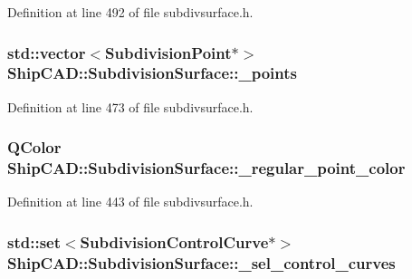 Definition at line 492 of file subdivsurface.\+h.

\subsubsection[{\texorpdfstring{\+\_\+points}{_points}}]{\setlength{\rightskip}{0pt plus 5cm}std\+::vector$<${\bf Subdivision\+Point}$\ast$$>$ Ship\+C\+A\+D\+::\+Subdivision\+Surface\+::\+\_\+points\hspace{0.3cm}{\ttfamily [protected]}}\hypertarget{classShipCAD_1_1SubdivisionSurface_ab03b7f4694a63eeb3ebb831484cb1bff}{}\label{classShipCAD_1_1SubdivisionSurface_ab03b7f4694a63eeb3ebb831484cb1bff}


Definition at line 473 of file subdivsurface.\+h.

\subsubsection[{\texorpdfstring{\+\_\+regular\+\_\+point\+\_\+color}{_regular_point_color}}]{\setlength{\rightskip}{0pt plus 5cm}Q\+Color Ship\+C\+A\+D\+::\+Subdivision\+Surface\+::\+\_\+regular\+\_\+point\+\_\+color\hspace{0.3cm}{\ttfamily [protected]}}\hypertarget{classShipCAD_1_1SubdivisionSurface_afee1585e376c34aa9b3be47f3a174cdb}{}\label{classShipCAD_1_1SubdivisionSurface_afee1585e376c34aa9b3be47f3a174cdb}


Definition at line 443 of file subdivsurface.\+h.

\subsubsection[{\texorpdfstring{\+\_\+sel\+\_\+control\+\_\+curves}{_sel_control_curves}}]{\setlength{\rightskip}{0pt plus 5cm}std\+::set$<${\bf Subdivision\+Control\+Curve}$\ast$$>$ Ship\+C\+A\+D\+::\+Subdivision\+Surface\+::\+\_\+sel\+\_\+control\+\_\+curves\hspace{0.3cm}{\ttfamily [protected]}}\hypertarget{classShipCAD_1_1SubdivisionSurface_abeb17606808d7eddb3917735bc8ac2bd}{}\label{classShipCAD_1_1SubdivisionSurface_abeb17606808d7eddb3917735bc8ac2bd}


